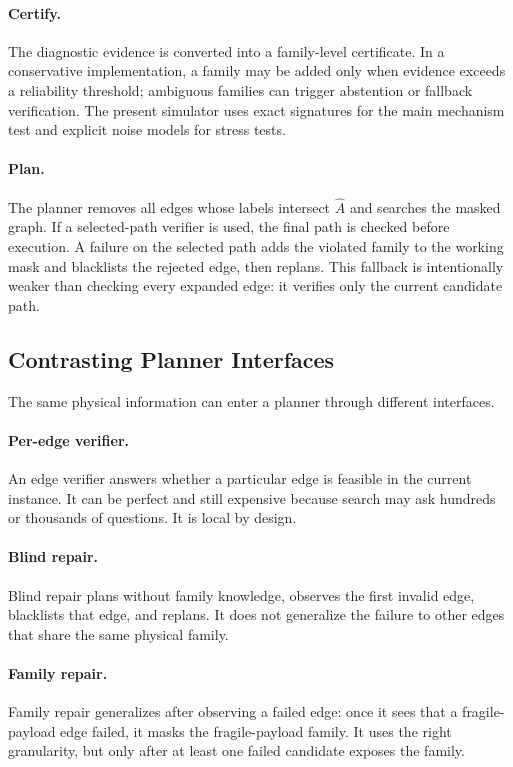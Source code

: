 \documentclass{article}
\newcommand{\Ahat}{\hat{A}}
\begin{document}
\paragraph{Certify.}
The diagnostic evidence is converted into a family-level certificate. In a conservative implementation, a family may be added only when evidence exceeds a reliability threshold; ambiguous families can trigger abstention or fallback verification. The present simulator uses exact signatures for the main mechanism test and explicit noise models for stress tests.

\paragraph{Plan.}
The planner removes all edges whose labels intersect $\Ahat$ and searches the masked graph. If a selected-path verifier is used, the final path is checked before execution. A failure on the selected path adds the violated family to the working mask and blacklists the rejected edge, then replans. This fallback is intentionally weaker than checking every expanded edge: it verifies only the current candidate path.

\subsection{Contrasting Planner Interfaces}

The same physical information can enter a planner through different interfaces.

\paragraph{Per-edge verifier.}
An edge verifier answers whether a particular edge is feasible in the current instance. It can be perfect and still expensive because search may ask hundreds or thousands of questions. It is local by design.

\paragraph{Blind repair.}
Blind repair plans without family knowledge, observes the first invalid edge, blacklists that edge, and replans. It does not generalize the failure to other edges that share the same physical family.

\paragraph{Family repair.}
Family repair generalizes after observing a failed edge: once it sees that a fragile-payload edge failed, it masks the fragile-payload family. It uses the right granularity, but only after at least one failed candidate exposes the family.
\end{document}
